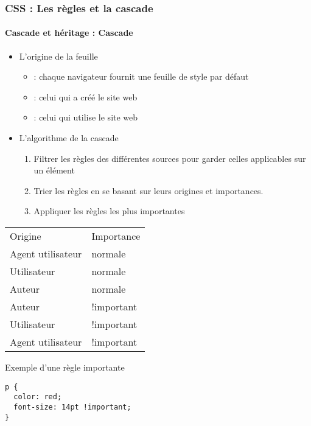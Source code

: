 \documentclass[xcolor=table]{beamer}
\begin{document}
\begin{frame}[fragile]
\frametitle{CSS : Les règles et la cascade}
\framesubtitle{Cascade et héritage : Cascade}

\begin{minipage}{0.60\textwidth}
	\begin{itemize}
		\item L'origine de la feuille
		\begin{itemize}
			\item {} : chaque navigateur fournit une feuille de style par défaut
			\item {} : celui qui a créé le site web 
			\item {} : celui qui utilise le site web 
		\end{itemize}
		\item L'algorithme de la cascade
		\begin{enumerate}
			\item Filtrer les règles des différentes sources pour garder celles applicables sur un élément
			\item Trier les règles en se basant sur leurs origines et importances.
			\item Appliquer les règles les plus importantes 
		\end{enumerate}
	\end{itemize}
\end{minipage}
%
\begin{minipage}{0.38\textwidth}
\begin{center}
	\scriptsize\bfseries
	\begin{tabular}{ll}
		\rowcolor{darkblue}
		\color{white}Origine & \color{white}Importance\\
		Agent utilisateur & normale\\
		Utilisateur & normale\\
		Auteur & normale\\
		Auteur & !important\\
		Utilisateur & !important\\
		Agent utilisateur & !important\\
	\end{tabular}
\end{center}
\begin{exampleblock}{Exemple d'une règle importante}
\lstset{escapeinside=**}
\tiny\bfseries
\begin{lstlisting}[language={HTML5}]
p {
  color: red;
  font-size: 14pt !important;
}
\end{lstlisting}
\end{exampleblock}
\end{minipage}
\end{frame}
\end{document}
